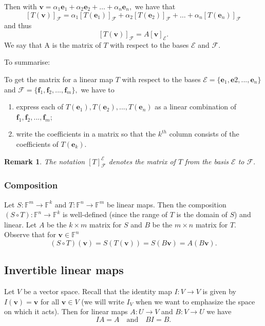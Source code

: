 \documentclass[12pt, a4paper]{article}
\newtheorem*{remark}{Remark}
\theoremstyle{definition}
\theoremstyle{plain}
\newcommand{\bb}[1]{\mathbb{#1}}
\newcommand{\vect}[1]{\mathbf{#1}}
\newcommand{\Cal}[1]{\mathcal{#1}}
\begin{document}
Then with $\vect{v}=\alpha_1\vect{e}_1+\alpha_2\vect{e}_2+\ldots+\alpha_n\vect{e}_n,$ we have that $$[T(\vect{v})]_{\Cal{F}}=\alpha_1[T(\vect{e}_1)]_{\Cal{F}}+\alpha_2[T(\vect{e}_2)]_{\Cal{F}}+\ldots+\alpha_n[T(\vect{e}_n)]_{\Cal{F}}$$ and thus $$[T(\vect{v})]_{\Cal{F}}=A[\vect{v}]_{\Cal{E}}.$$ We say that A is the matrix of $T$ with respect to the bases $\Cal{E}$ and $\Cal{F}.$ 

To summarise:

\begin{tcolorbox}
To get the matrix for a linear map $T$ with respect to the bases $\Cal{E} = \{\vect{e}_1,\vect{e}2,...,\vect{e}_n\}$ and $\Cal{F} = \{\vect{f}_1,\vect{f}_2,...,\vect{f}_m\},$ we have to 
\begin{enumerate}
	
	\item express each of $T(\vect{e}_1),T(\vect{e}_2),...,T(\vect{e}_n)$ as a linear combination of $\vect{f}_1,\vect{f}_2,...,\vect{f}_m$;

	\item write the coefficients in a matrix so that the $k^{th}$ column consists of the coefficients of $T(\vect{e}_k).$

\end{enumerate}
\end{tcolorbox}

\begin{remark}
The notation $[T]_{\Cal{F}}^{\Cal{E}}$ denotes the matrix of $T$ from the basis $\Cal{E}$ to $\Cal{F}.$
\end{remark}

\subsubsection{Composition} 

Let $S : \bb{F}^m \rightarrow \bb{F}^k$ and $T : \bb{F}^n \rightarrow \bb{F}^m$ be linear maps. Then the composition $(S\circ T): \bb{F}^n \rightarrow \bb{F}^k$ is well-defined (since the range of $T$ is the domain of $S$) and linear. Let $A$ be the $k \times m$ matrix for $S$ and $B$ be the $m \times n$ matrix for $T.$ Observe that for $\vect{v} \in \bb{F}^n$ $$(S \circ T) (\vect{v})=S(T(\vect{v}))=S(B\vect{v})=A(B\vect{v}).$$


\subsection{Invertible linear maps}

Let $V$ be a vector space. Recall that the identity map $I:V \rightarrow V$ is given by $I(\vect{v})=\vect{v}$ for all $\vect{v} \in V$ (we will write $I_V$ when we want to emphasize the space on which it acts). Then for linear maps $A : U \rightarrow V$ and $B : V \rightarrow U$ we have $$ IA=A \quad \text{and} \quad BI =B.$$
\end{document}
